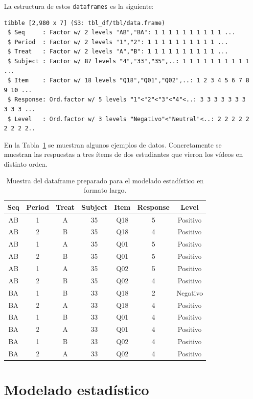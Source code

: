 \documentclass[
  12pt,
  a4paper,
  extrafontsizes,
  onecolumn,
  openright,
  table]{memoir}
\begin{document}
La estructura de estos \texttt{dataframes} es la siguiente:

\begin{verbatim}
tibble [2,980 x 7] (S3: tbl_df/tbl/data.frame)
 $ Seq     : Factor w/ 2 levels "AB","BA": 1 1 1 1 1 1 1 1 1 1 ...
 $ Period  : Factor w/ 2 levels "1","2": 1 1 1 1 1 1 1 1 1 1 ...
 $ Treat   : Factor w/ 2 levels "A","B": 1 1 1 1 1 1 1 1 1 1 ...
 $ Subject : Factor w/ 87 levels "4","33","35",..: 1 1 1 1 1 1 1 1 1 1 ...
 $ Item    : Factor w/ 18 levels "Q18","Q01","Q02",..: 1 2 3 4 5 6 7 8 9 10 ...
 $ Response: Ord.factor w/ 5 levels "1"<"2"<"3"<"4"<..: 3 3 3 3 3 3 3 3 3 3 ...
 $ Level   : Ord.factor w/ 3 levels "Negativo"<"Neutral"<..: 2 2 2 2 2 2 2 2 2..
\end{verbatim}

En la Tabla~\ref{tbl-df_response} se muestran algunos ejemplos de datos.
Concretamente se muestran las respuestas a tres ítems de dos estudiantes
que vieron los vídeos en distinto orden.

\hypertarget{tbl-df_response}{}
\begin{longtable}{ccccccc}
\caption{\label{tbl-df_response}Muestra del dataframe preparado para el modelado estadístico en formato
largo. }\tabularnewline

\toprule
Seq & Period & Treat & Subject & Item & Response & Level \\ 
\midrule
AB & 1 & A & 35 & Q18 & 5 & Positivo \\ 
AB & 2 & B & 35 & Q18 & 4 & Positivo \\ 
AB & 1 & A & 35 & Q01 & 5 & Positivo \\ 
AB & 2 & B & 35 & Q01 & 5 & Positivo \\ 
AB & 1 & A & 35 & Q02 & 5 & Positivo \\ 
AB & 2 & B & 35 & Q02 & 4 & Positivo \\ 
BA & 1 & B & 33 & Q18 & 2 & Negativo \\ 
BA & 2 & A & 33 & Q18 & 4 & Positivo \\ 
BA & 1 & B & 33 & Q01 & 4 & Positivo \\ 
BA & 2 & A & 33 & Q01 & 4 & Positivo \\ 
BA & 1 & B & 33 & Q02 & 4 & Positivo \\ 
BA & 2 & A & 33 & Q02 & 4 & Positivo \\ 
\bottomrule
\end{longtable}


\hypertarget{sec-modelado}{%
\chapter{Modelado estadístico}\label{sec-modelado}}
\end{document}
